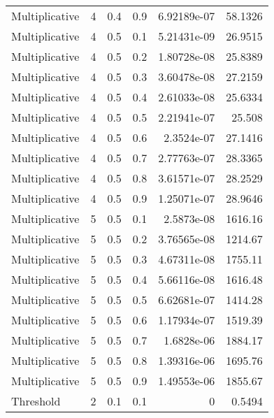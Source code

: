 \documentclass{article}
\begin{document}
\begin{longtable}[H]{lrrrrr}
 Multiplicative &       4 &   0.4 &            0.9 &      6.92189e-07 &         58.1326 \\
 Multiplicative &       4 &   0.5 &            0.1 &      5.21431e-09 &         26.9515 \\
 Multiplicative &       4 &   0.5 &            0.2 &      1.80728e-08 &         25.8389 \\
 Multiplicative &       4 &   0.5 &            0.3 &      3.60478e-08 &         27.2159 \\
 Multiplicative &       4 &   0.5 &            0.4 &      2.61033e-08 &         25.6334 \\
 Multiplicative &       4 &   0.5 &            0.5 &      2.21941e-07 &         25.508  \\
 Multiplicative &       4 &   0.5 &            0.6 &      2.3524e-07  &         27.1416 \\
 Multiplicative &       4 &   0.5 &            0.7 &      2.77763e-07 &         28.3365 \\
 Multiplicative &       4 &   0.5 &            0.8 &      3.61571e-07 &         28.2529 \\
 Multiplicative &       4 &   0.5 &            0.9 &      1.25071e-07 &         28.9646 \\
 Multiplicative &       5 &   0.5 &            0.1 &      2.5873e-08  &       1616.16   \\
 Multiplicative &       5 &   0.5 &            0.2 &      3.76565e-08 &       1214.67   \\
 Multiplicative &       5 &   0.5 &            0.3 &      4.67311e-08 &       1755.11   \\
 Multiplicative &       5 &   0.5 &            0.4 &      5.66116e-08 &       1616.48   \\
 Multiplicative &       5 &   0.5 &            0.5 &      6.62681e-07 &       1414.28   \\
 Multiplicative &       5 &   0.5 &            0.6 &      1.17934e-07 &       1519.39   \\
 Multiplicative &       5 &   0.5 &            0.7 &      1.6828e-06  &       1884.17   \\
 Multiplicative &       5 &   0.5 &            0.8 &      1.39316e-06 &       1695.76   \\
 Multiplicative &       5 &   0.5 &            0.9 &      1.49553e-06 &       1855.67   \\
 Threshold      &       2 &   0.1 &            0.1 &      0           &          0.5494 \\

\end{longtable}
\end{document}
